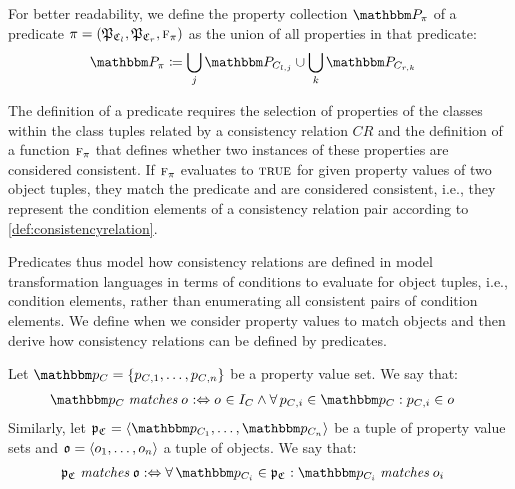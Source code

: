 For better readability, we define the property collection $\propertycollection{\pi}$ of a predicate $\pi = (\propertysettuple{P}{\classtuple{C}{l}}, \propertysettuple{P}{\classtuple{C}{r}}, \function{f}_\pi)$ as the union of all properties in that predicate:
\begin{align*}
    &
    \propertycollection{\pi} \equalsperdefinition \bigcup_{j} \propertyset{P}{\class{C}{l,j}} \cup \bigcup_{k} \propertyset{P}{\class{C}{r,k}}
\end{align*}

The definition of a predicate requires the selection of properties of the classes within the class tuples related by a consistency relation $CR$ and the definition of a function $\textsc{f}_\pi$ that defines whether two instances of these properties are considered consistent.
If $\textsc{f}_\pi$ evaluates to $\textsc{true}$ for given property values of two object tuples, they match the predicate and are considered consistent, i.e., they represent the condition elements of a consistency relation pair according to \autoref{def:consistencyrelation}.

Predicates thus model how consistency relations are defined in model transformation languages in terms of conditions to evaluate for object tuples, i.e., condition elements, rather than enumerating all consistent pairs of condition elements.
We define when we consider property values to match objects and then derive how consistency relations can be defined by predicates.

\begin{definition}
Let $\propertyvalueset{p}{\class{C}{}} = \setted{p_{\class{C}{}, 1}, \dots, p_{\class{C}{}, n}}$ be a property value set. We say that:
\begin{align*}
    &
    \propertyvalueset{p}{\class{C}{}} \matchesmath \object{o}{} \equivalentperdefinition
    \object{o}{} \in I_{\class{C}{}} \land \forall p_{\class{C}{}, i} \in \propertyvalueset{p}{\class{C}{}} : p_{\class{C}{}, i} \in \object{o}{}
\end{align*}
%
Similarly, let $\propertyvaluesettuple{p}{\classtuple{C}{}} = \tupled{\propertyvalueset{p}{\class{C}{1}}, \dots, \propertyvalueset{p}{\class{C}{n}}}$ be a tuple of property value sets and $\tuple{o} = \tupled{\object{o}{1}, \dots, \object{o}{n}}$ a tuple of objects. We say that:
\begin{align*}
    &
    \propertyvaluesettuple{p}{\classtuple{C}{}} \matchesmath \tuple{o} \equivalentperdefinition
    \forall \propertyvalueset{p}{\class{C}{i}} \in \propertyvaluesettuple{p}{\classtuple{C}{}} : \propertyvalueset{p}{\class{C}{i}} \matchesmath \object{o}{i}
\end{align*}
\end{definition}

